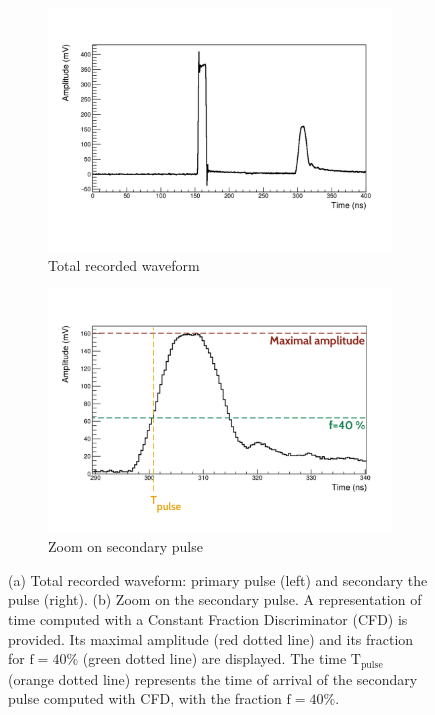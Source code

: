 \begin{figure}[h]
\centering
\begin{subfigure}[t]{0.7\textwidth}
  \centering
  \includegraphics[trim={1.2cm 3.5cm 1.7cm 3.1cm},clip,width=1\textwidth]{commissioning/fig_commissioning/CFD_example.pdf}
  \captionsetup{justification=centering}
  \caption{Total recorded waveform
    \label{subfig:total_waveform}}
\end{subfigure}
\hfill
\begin{subfigure}[t]{0.7\textwidth}
  \centering
  \includegraphics[trim={1.2cm 1.5cm 1.7cm 3.1cm},clip,width=1\textwidth]{commissioning/fig_commissioning/CFD_example_zoom.pdf}
  \captionsetup{justification=centering}
  \caption{Zoom on secondary pulse
    \label{subfig:zoom_secondary}}
\end{subfigure}
\caption{(a) Total recorded waveform: primary pulse (left) and secondary the pulse (right).
  (b) Zoom on the secondary pulse.
    A representation of time computed with a Constant Fraction Discriminator (CFD) is provided.
    Its maximal amplitude (red dotted line) and its fraction for $\text{f}=40\%$ (green dotted line) are displayed.
    The time $\text{T}_{\text{pulse}}$ (orange dotted line) represents the time of arrival of the secondary pulse computed with CFD, with the fraction $\text{f}=40\%$.
  \label{fig:CFD}}
\end{figure}
